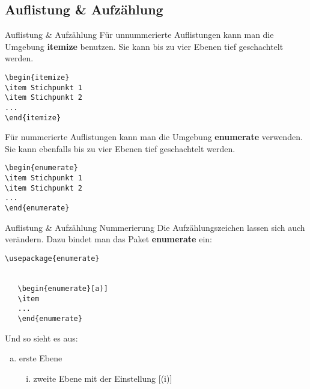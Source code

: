 \subsection{Auflistung \& Aufzählung}
\begin{frame}[fragile]{Auflistung \& Aufzählung}
Für unnummerierte Auflistungen kann man die Umgebung \textbf{itemize} benutzen. Sie kann bis zu vier Ebenen tief geschachtelt werden.
\begin{lstlisting}[style=tex]
\begin{itemize}
\item Stichpunkt 1
\item Stichpunkt 2
...
\end{itemize}
\end{lstlisting}%
Für nummerierte Auflistungen kann man die Umgebung \textbf{enumerate} verwenden. Sie kann ebenfalls bis zu vier Ebenen tief geschachtelt werden.
\begin{lstlisting}[style=tex]
\begin{enumerate}
\item Stichpunkt 1
\item Stichpunkt 2
...
\end{enumerate}
\end{lstlisting}
\end{frame}

\begin{frame}[fragile]{Auflistung \& Aufzählung Nummerierung}
Die Aufzählungszeichen lassen sich auch verändern.
Dazu bindet man das Paket \textbf{enumerate} ein:
\begin{lstlisting}[style=tex]
\usepackage{enumerate}


   \begin{enumerate}[a)]
   \item
   ...
   \end{enumerate}
\end{lstlisting}\pause

\bigskip
Und so sieht es aus:
\begin{enumerate}[a)]
\item erste Ebene
\begin{enumerate}[(i)]
\item zweite Ebene mit der Einstellung [(i)]
\end{enumerate}
\end{enumerate}
\end{frame}


